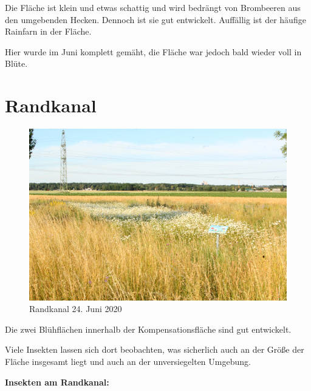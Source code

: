 \documentclass[10pt]{article}
\begin{document}
Die Fläche ist klein und etwas schattig und wird bedrängt von Brombeeren aus den umgebenden Hecken.
Dennoch ist sie gut entwickelt. Auffällig ist der häufige Rainfarn in der Fläche.

Hier wurde im Juni komplett gemäht, die Fläche war jedoch bald wieder voll in Blüte.

\clearpage
\section{Randkanal}
\begin{figure}[h!]
  \includegraphics[width=\linewidth]{img/randkanal/juni.jpg}
  \caption{Randkanal 24. Juni 2020}
  \label{fig:randkanal juni}
\end{figure}

Die zwei Blühflächen innerhalb der Kompensationsfläche sind gut entwickelt.

Viele Insekten lassen sich dort beobachten, was sicherlich auch an der Größe der Fläche insgesamt liegt und auch an der unversiegelten Umgebung.

\clearpage
\textbf{Insekten am Randkanal:}
\end{document}
